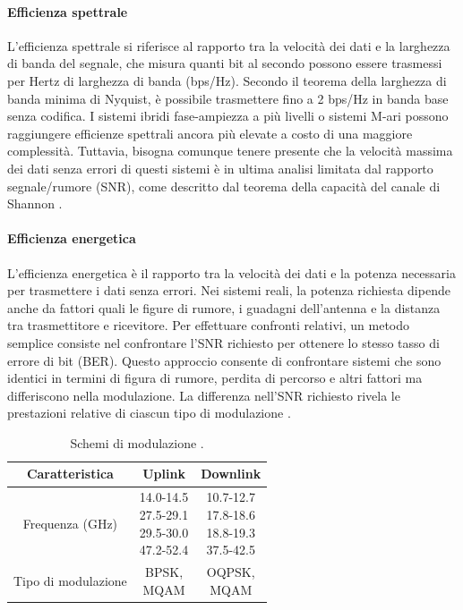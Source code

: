 \paragraph{Efficienza spettrale}
L'efficienza spettrale si riferisce al rapporto tra la velocità dei dati e la larghezza di banda del segnale, che misura quanti bit al secondo possono essere trasmessi per Hertz di larghezza di banda (bps/Hz).
Secondo il teorema della larghezza di banda minima di Nyquist, è possibile trasmettere fino a 2 bps/Hz in banda base senza codifica.
I sistemi ibridi fase-ampiezza a più livelli o sistemi M-ari possono raggiungere efficienze spettrali ancora più elevate a costo di una maggiore complessità. Tuttavia, bisogna comunque tenere presente che la velocità massima dei dati senza errori di questi sistemi è in ultima analisi limitata dal rapporto segnale/rumore (\ac{SNR}), come descritto dal teorema della capacità del canale di Shannon \cite{don_k_lefevre_power-efficient_1989}.

\paragraph{Efficienza energetica}
L'efficienza energetica è il rapporto tra la velocità dei dati e la potenza necessaria per trasmettere i dati senza errori.
Nei sistemi reali, la potenza richiesta dipende anche da fattori quali le figure di rumore, i guadagni dell'antenna e la distanza tra trasmettitore e ricevitore.
Per effettuare confronti relativi, un metodo semplice consiste nel confrontare l'\ac{SNR} richiesto per ottenere lo stesso tasso di errore di bit (\ac{BER}).
Questo approccio consente di confrontare sistemi che sono identici in termini di figura di rumore, perdita di percorso e altri fattori ma differiscono nella modulazione.
La differenza nell'SNR richiesto rivela le prestazioni relative di ciascun tipo di modulazione \cite{don_k_lefevre_power-efficient_1989}.

\begin{table}[h]
\centering
\begin{tabular}{|c|c|c|}
\hline
\textbf{Caratteristica} & \textbf{Uplink} & \textbf{Downlink} \\ \hline
Frequenza (GHz)  & \makecell{14.0-14.5 \\ 27.5-29.1 \\ 29.5-30.0 \\ 47.2-52.4}  & \makecell{10.7-12.7\\17.8-18.6\\18.8-19.3\\37.5-42.5} \\ \hline
Tipo di modulazione  & \makecell{\acs{BPSK},\\M\acs{QAM}} & \makecell{\acs{OQPSK},\\ M\acs{QAM}} \\ \hline
\end{tabular}
\caption{Schemi di modulazione \cite{rozenvasser_estimation_2023}.}
\label{tab:starlink-frequency-allocation-modulation-type}
\end{table}

